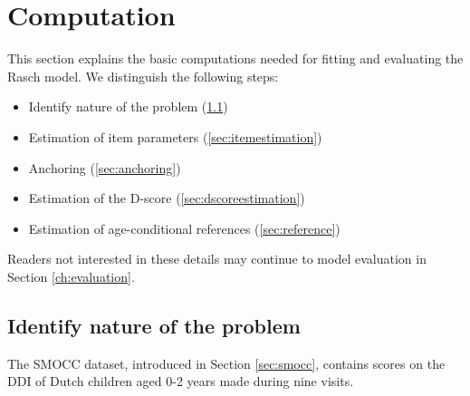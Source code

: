 \documentclass[
]{book}
\providecommand{\tightlist}{%
  \setlength{\itemsep}{0pt}\setlength{\parskip}{0pt}}
\begin{document}
\newpage

\hypertarget{ch:computation}{%
\chapter{Computation}\label{ch:computation}}

This section explains the basic computations needed for fitting and evaluating the Rasch model. We distinguish the following steps:

\begin{itemize}
\tightlist
\item
  Identify nature of the problem (\ref{sec:datapreparation})
\item
  Estimation of item parameters (\ref{sec:itemestimation})
\item
  Anchoring (\ref{sec:anchoring})
\item
  Estimation of the D-score (\ref{sec:dscoreestimation})
\item
  Estimation of age-conditional references (\ref{sec:reference})
\end{itemize}

Readers not interested in these details may continue to model evaluation in Section \ref{ch:evaluation}.

\hypertarget{sec:datapreparation}{%
\section{Identify nature of the problem}\label{sec:datapreparation}}

The SMOCC dataset, introduced in Section \ref{sec:smocc}, contains scores on the DDI of Dutch children aged 0-2 years made during nine visits.
\end{document}
